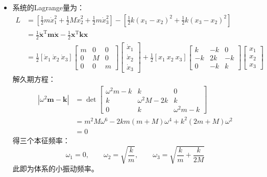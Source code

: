 \documentclass[a4paper,fontset=windows]{ctexart}
\begin{document}
\begin{itemize}
        \item[3.4.(1)]
        系统的Lagrange量为：
        \begin{align*}
            L
            &= \left[\frac{1}{2}m\dot{x}_1^2 + \frac{1}{2}M\dot{x}_2^2 + \frac{1}{2}m\dot{x}_3^2\right] - \left[\frac{1}{2}k(x_1-x_2)^2 + \frac{1}{2}k(x_3-x_2)^2\right] \\
            &= \frac{1}{2}\boldsymbol{\dot{x}}^{\mathrm{T}}\boldsymbol{m}\boldsymbol{\dot{x}} - \frac{1}{2}\boldsymbol{x}^{\mathrm{T}}\boldsymbol{k}\boldsymbol{x} \\
            &= \frac{1}{2}
            [\dot{x}_1\ \dot{x}_2\ \dot{x}_3]
            \begin{bmatrix}
                m & 0 & 0 \\
                0 & M & 0 \\
                0 & 0 & m
            \end{bmatrix}
            \begin{bmatrix}
                \dot{x}_1 \\
                \dot{x}_2 \\
                \dot{x}_3
            \end{bmatrix}
            + \frac{1}{2}
            [x_1\ x_2\ x_3]
            \begin{bmatrix}
                k & -k & 0 \\
                -k & 2k & -k \\
                0 & -k & k
            \end{bmatrix}
            \begin{bmatrix}
                x_1 \\
                x_2 \\
                x_3
            \end{bmatrix}
        \end{align*}
        解久期方程：
        \begin{align*}
        \left|\omega^2\boldsymbol{m}- \boldsymbol{k}\right|
        &= \det
        \begin{bmatrix}
            \omega^{2}m-k & k & 0 \\
            k & \omega^{2}M-2k & k \\
            0 & k & \omega^{2}m-k
        \end{bmatrix} \\
        &= m^2M\omega^6-2km(m+M)\omega^4+k^2(2m+M)\omega^2 \\
        &= 0
        \end{align*}
        得三个本征频率：
        \[
        \omega_1 = 0,\qquad \omega_2 = \sqrt{\frac{k}{m}},\qquad \omega_3 = \sqrt{\frac{k}{m}+\frac{k}{2M}}
        \]
        此即为体系的小振动频率。
        \medskip


\end{itemize}
\end{document}
